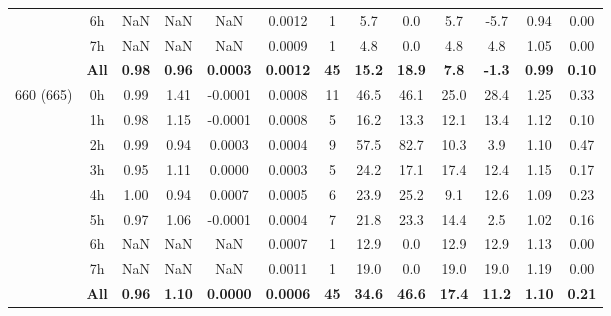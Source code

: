 \documentclass[preview]{standalone}
\begin{document}
\begin{tabular}{ccccccccccccc}
 & 6h  & NaN & NaN & NaN & 0.0012 &  1 & 5.7 & 0.0 & 5.7 & -5.7 & 0.94 & 0.00 \\ 
 & 7h  & NaN & NaN & NaN & 0.0009 &  1 & 4.8 & 0.0 & 4.8 & 4.8 & 1.05 & 0.00 \\ \cline{2-13}
& \textbf{All} & \textbf{0.98} & \textbf{0.96} & \textbf{0.0003} & \textbf{0.0012} & \textbf{45} & \textbf{15.2} & \textbf{18.9} & \textbf{7.8} & \textbf{-1.3} & \textbf{0.99} & \textbf{0.10} \\ \hline
\multirow{9}{*}{660 (665)} & 0h & 0.99 & 1.41 & -0.0001 & 0.0008 & 11 & 46.5 & 46.1 & 25.0 & 28.4 & 1.25 & 0.33 \\ 
 & 1h  & 0.98 & 1.15 & -0.0001 & 0.0008 &  5 & 16.2 & 13.3 & 12.1 & 13.4 & 1.12 & 0.10 \\ 
 & 2h  & 0.99 & 0.94 & 0.0003 & 0.0004 &  9 & 57.5 & 82.7 & 10.3 & 3.9 & 1.10 & 0.47 \\ 
 & 3h  & 0.95 & 1.11 & 0.0000 & 0.0003 &  5 & 24.2 & 17.1 & 17.4 & 12.4 & 1.15 & 0.17 \\ 
 & 4h  & 1.00 & 0.94 & 0.0007 & 0.0005 &  6 & 23.9 & 25.2 & 9.1 & 12.6 & 1.09 & 0.23 \\ 
 & 5h  & 0.97 & 1.06 & -0.0001 & 0.0004 &  7 & 21.8 & 23.3 & 14.4 & 2.5 & 1.02 & 0.16 \\ 
 & 6h  & NaN & NaN & NaN & 0.0007 &  1 & 12.9 & 0.0 & 12.9 & 12.9 & 1.13 & 0.00 \\ 
 & 7h  & NaN & NaN & NaN & 0.0011 &  1 & 19.0 & 0.0 & 19.0 & 19.0 & 1.19 & 0.00 \\ \cline{2-13}
& \textbf{All} & \textbf{0.96} & \textbf{1.10} & \textbf{0.0000} & \textbf{0.0006} & \textbf{45} & \textbf{34.6} & \textbf{46.6} & \textbf{17.4} & \textbf{11.2} & \textbf{1.10} & \textbf{0.21} \\ \hline
\hline 
\end{tabular}
\end{document}
